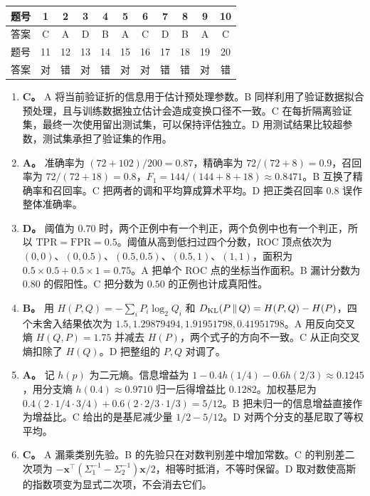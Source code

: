 \begin{center}
\begin{tabular}{c*{10}{c}}
题号 & 1 & 2 & 3 & 4 & 5 & 6 & 7 & 8 & 9 & 10\\
\hline
答案 & C & A & D & B & A & C & D & B & A & C\\[3pt]
题号 & 11 & 12 & 13 & 14 & 15 & 16 & 17 & 18 & 19 & 20\\
\hline
答案 & 对 & 错 & 对 & 错 & 对 & 对 & 错 & 错 & 对 & 错\\
\end{tabular}
\end{center}

\begin{enumerate}[label=\arabic*.]
\item \textbf{C。} A 将当前验证折的信息用于估计预处理参数。B 同样利用了验证数据拟合预处理，且与训练数据独立估计会造成变换口径不一致。C 在每折隔离验证集，最终一次使用留出测试集，可以保持评估独立。D 用测试结果比较超参数，测试集承担了验证集的作用。
\item \textbf{A。} 准确率为 $(72+102)/200=0.87$，精确率为 $72/(72+8)=0.9$，召回率为 $72/(72+18)=0.8$，$F_1=144/(144+8+18)\approx0.8471$。B 互换了精确率和召回率。C 把两者的调和平均算成算术平均。D 把正类召回率 $0.8$ 误作整体准确率。
\item \textbf{D。} 阈值为 $0.70$ 时，两个正例中有一个判正，两个负例中也有一个判正，所以 $\mathrm{TPR}=\mathrm{FPR}=0.5$。阈值从高到低扫过四个分数，ROC 顶点依次为 $(0,0)$、$(0,0.5)$、$(0.5,0.5)$、$(0.5,1)$、$(1,1)$，面积为 $0.5\times0.5+0.5\times1=0.75$。A 把单个 ROC 点的坐标当作面积。B 漏计分数为 $0.80$ 的假阳性。C 把分数为 $0.50$ 的正例也计成真阳性。
\item \textbf{B。} 用 $H(P,Q)=-\sum_i P_i\log_2Q_i$ 和 $D_{\mathrm{KL}}(P\,\|\,Q)=H(P,Q)-H(P)$，四个未舍入结果依次为 $1.5,1.29879494,1.91951798,0.41951798$。A 用反向交叉熵 $H(Q,P)=1.75$ 并减去 $H(P)$，两个式子的方向不一致。C 从正向交叉熵扣除了 $H(Q)$。D 把整组的 $P,Q$ 对调了。
\item \textbf{A。} 记 $h(p)$ 为二元熵。信息增益为 $1-0.4h(1/4)-0.6h(2/3)\approx0.1245$，用分支熵 $h(0.4)\approx0.9710$ 归一后得增益比 $0.1282$。加权基尼为 $0.4(2\cdot 1/4\cdot 3/4)+0.6(2\cdot 2/3\cdot 1/3)=5/12$。B 把未归一的信息增益直接作为增益比。C 给出的是基尼减少量 $1/2-5/12$。D 对两个分支的基尼取了等权平均。
\item \textbf{C。} A 漏乘类别先验。B 的先验只在对数判别差中增加常数。C 的判别差二次项为 $-\bm x^\top(\Sigma_1^{-1}-\Sigma_2^{-1})\bm x/2$，相等时抵消，不等时保留。D 取对数使高斯的指数项变为显式二次项，不会消去它们。

\end{enumerate}
